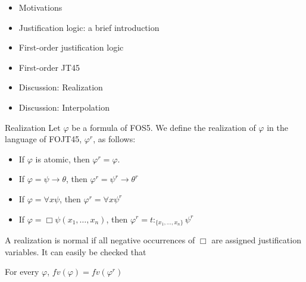 \documentclass{beamer}
\theoremstyle{definition}
\newcommand{\impli}{\rightarrow}
\newcommand{\todo}{\forall}
\begin{document}
\begin{frame}
	\begin{itemize}
		\item[] Motivations
		\vspace{5mm}
		\item[] Justification logic: a brief introduction
		\vspace{5mm}
		\item[] First-order justification logic
		\vspace{5mm}
		\item[] First-order JT45
		\vspace{5mm}
		\item[] {\color{blue}Discussion: Realization}
		\vspace{5mm}
		\item[] Discussion: Interpolation
	\end{itemize} 
\end{frame}


\begin{frame}{Realization}
\qquad Let $\varphi$ be a formula of FOS5. We define the {\color{blue}realization} of $\varphi$ in the language of FOJT45, $\varphi^{r}$, as follows:


\begin{itemize}
\item If $\varphi$ is atomic, then $\varphi^{r} = \varphi$.
\item If $\varphi = \psi\impli\theta$, then $\varphi^{r} = \psi^{r}\impli\theta^{r}$
\item If $\varphi = \todo x \psi$, then $\varphi^{r} = \todo x \psi^{r}$
\item If $\varphi = \Box \psi (x_{1}, \dots, x_{n})$, then $\varphi^{r} =t$$:_{\{x_{1}, \dots, x_{n}\}}$$ \psi^{r}$
\end{itemize}

\qquad A realization is normal if all negative occurrences of $\Box$ are assigned justification variables. It can easily be checked that

\begin{center}
For every $\varphi$, $fv(\varphi) = fv(\varphi^{r})$
\end{center}
\end{frame}
\end{document}
